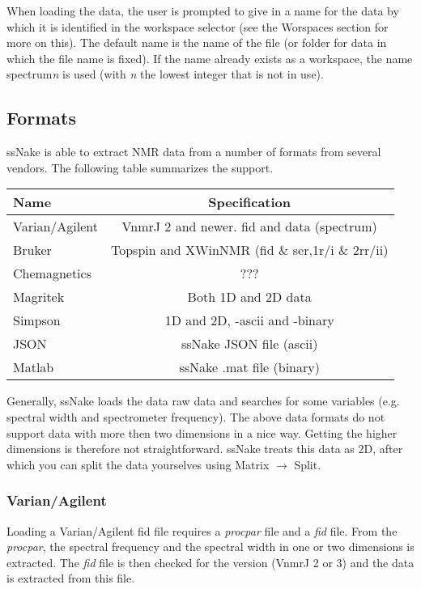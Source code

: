 \documentclass[11pt,a4paper]{article}
\begin{document}
When loading the data, the user is prompted to give in a name for the data by which it is identified in the workspace selector (see the Worspaces section for more on this). The default name is the name of the file (or folder for data in which the file name is fixed). If the name already exists as a workspace, the name spectrum\textit{n} is used (with \textit{n} the lowest integer that is not in use).


\subsection{Formats}
ssNake is able to extract NMR data from a number of formats from several vendors. The following table summarizes the support.

\begin{center}
\begin{tabular}{lc}
\toprule
Name & Specification \\
\midrule
\rowcolor{gray!30!white}
Varian/Agilent & VnmrJ 2 and newer. fid and data (spectrum)\\
Bruker & Topspin and XWinNMR (fid \& ser,1r/i \& 2rr/ii) \\
\rowcolor{gray!30!white}
Chemagnetics & ??? \\
Magritek & Both 1D and 2D data \\
\rowcolor{gray!30!white}
Simpson & 1D and 2D, -ascii and -binary \\
JSON & ssNake JSON file (ascii)\\
\rowcolor{gray!30!white}
Matlab & ssNake .mat file (binary)\\
\bottomrule
\end{tabular}
\end{center}

Generally, ssNake loads the data raw data and searches for some variables (e.g. spectral width and spectrometer frequency). The above data formats do not support data with more then two dimensions in a nice way. Getting the higher dimensions is therefore not straightforward. ssNake treats this data as 2D, after which you can split the data yourselves using Matrix $\rightarrow$ Split.

\subsubsection*{Varian/Agilent}
Loading a Varian/Agilent fid file requires a \textit{procpar} file and a \textit{fid} file. From the \textit{procpar}, the spectral frequency and the spectral width in one or two dimensions is extracted. The \textit{fid} file is then checked for the version (VnmrJ 2 or 3) and the data is extracted from this file.
\end{document}

